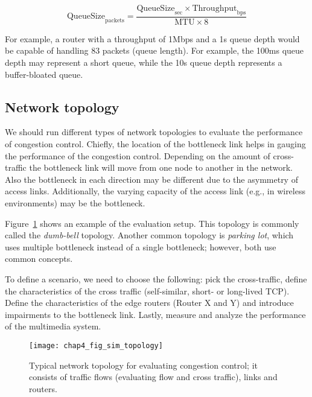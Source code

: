 \begin{equation*}
  \mathrm{QueueSize}_\mathrm{packets} = 
    \frac{\mathrm{QueueSize}_\mathrm{sec} \times
    \mathrm{Throughput}_\mathrm{bps}}{\mathrm{MTU} \times \mathrm{8}}
\end{equation*}

For example, a router with a throughput of 1Mbps and a 1s queue depth would be
capable of handling 83 packets (queue length). For example, the 100ms queue
depth may represent a short queue, while the 10s queue depth represents a
buffer-bloated queue.

\subsection{Network topology}

We should run different types of network topologies to evaluate the
performance of congestion control. Chiefly, the location of the bottleneck
link helps in gauging the performance of the congestion control. Depending on
the amount of cross-traffic the bottleneck link will move from one node to
another in the network. Also the bottleneck in each direction may be different
due to the asymmetry of access links. Additionally, the varying capacity of
the access link (e.g., in wireless environments) may be the bottleneck.

Figure~\ref{fig:4:topology} shows an example of the evaluation setup. This
topology is commonly called the \emph{dumb-bell} topology. Another common
topology is \emph{parking lot}, which uses multiple bottleneck instead of a
single bottleneck; however, both use common concepts. 


To define a scenario, we need to choose the following: pick the cross-traffic,
define the characteristics of the cross traffic (self-similar, short- or
long-lived TCP). Define the characteristics of the edge routers (Router X and
Y) and introduce impairments to the bottleneck link. Lastly, measure and
analyze the performance of the multimedia system. 


\begin{figure}[!h]
\texttt{[image: chap4\_fig\_sim\_topology]}
\caption{Typical network topology for evaluating congestion control;
		 it consists of traffic flows (evaluating flow and cross 
		 traffic), links and routers.}
\label{fig:4:topology}
\end{figure}



